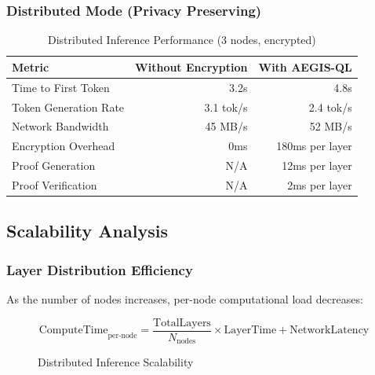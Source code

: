 \documentclass[11pt,a4paper]{article}
\begin{document}
\subsubsection{Distributed Mode (Privacy Preserving)}

\begin{table}[H]
\centering
\caption{Distributed Inference Performance (3 nodes, encrypted)}
\begin{tabular}{|l|r|r|}
\hline
\textbf{Metric} & \textbf{Without Encryption} & \textbf{With AEGIS-QL} \\
\hline
Time to First Token & 3.2s & 4.8s \\
Token Generation Rate & 3.1 tok/s & 2.4 tok/s \\
Network Bandwidth & 45 MB/s & 52 MB/s \\
Encryption Overhead & 0ms & 180ms per layer \\
Proof Generation & N/A & 12ms per layer \\
Proof Verification & N/A & 2ms per layer \\
\hline
\end{tabular}
\end{table}

\subsection{Scalability Analysis}

\subsubsection{Layer Distribution Efficiency}

As the number of nodes increases, per-node computational load decreases:

\begin{equation}
\text{ComputeTime}_{\text{per-node}} = \frac{\text{TotalLayers}}{N_{\text{nodes}}} \times \text{LayerTime} + \text{NetworkLatency}
\end{equation}

\begin{figure}[H]
\centering
{}
\caption{Distributed Inference Scalability}
\end{figure}
\end{document}
